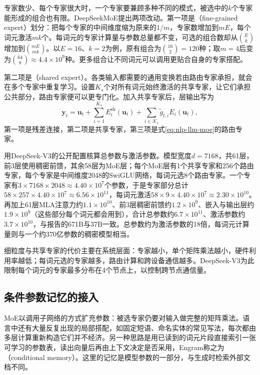 专家数少、每个专家很大时，一个专家要兼顾多种不同的模式，被选中的$k$个专家能形成的组合也有限。DeepSeekMoE提出两项改动。第一项是（fine-grained expert）划分：把每个专家的中间维度缩为原来的$1/m$，专家数增加到$mE$，每个词元激活$mk$个。每词元的专家计算量与参数总量都不变，可选的组合数却从$\binom{E}{k}$增加到$\binom{mE}{mk}$。以$E=16$、$k=2$为例，原有组合为$\binom{16}{2}=120$种；取$m=4$后变为$\binom{64}{8}\approx4.4\times10^9$种。更多组合让不同词元可以调用更贴合自身的专家搭配。

第二项是（shared expert）。各类输入都需要的通用变换若由路由专家承担，就会在多个专家中重复学习。设置$K_s$个对所有词元始终激活的共享专家，让它们承担公共部分，路由专家便可以更专门化。加入共享专家后，层输出写为
\begin{equation}
 \bm y_t=\bm u_t+\sum_{i=1}^{K_s}E_i^{\mathrm{sh}}(\bm u_t)+\sum_{i\in\mathcal K_t}\tilde g_{t,i}E_i(\bm u_t),
 \label{eq:nlp-llm-shared-experts}
\end{equation}
第一项是残差连接，第二项是共享专家，第三项是式\eqref{eq:nlp-llm-moe}的路由专家。

用DeepSeek-V3的公开配置核算总参数与激活参数。模型宽度$d=7168$，共61层，前3层使用稠密前馈，其余58层为MoE层；每个MoE层有1个共享专家和256个路由专家，每个专家是中间维度2048的SwiGLU网络，每词元选8个路由专家。一个专家有$3\times7168\times2048\approx4.40\times10^7$个参数，于是专家部分总计$58\times257\times4.40\times10^7\approx6.56\times10^{11}$，每词元激活$58\times9\times4.40\times10^7\approx2.30\times10^{10}$。再加上61层MLA注意力约$1.1\times10^{10}$、前3层稠密前馈约$1.2\times10^9$、嵌入与输出层约$1.9\times10^9$（这些部分每个词元都会用到），合计总参数约$6.7\times10^{11}$、激活参数约$3.7\times10^{10}$，与报告的671B与37B一致。总参数约为激活参数的18倍，每词元计算量则与一个约370亿参数的稠密模型相当。

细粒度与共享专家的代价主要在系统层面：专家越小，单个矩阵乘法越小，硬件利用率越低；每词元选的专家越多，路由计算和跨设备通信越多。DeepSeek-V3为此限制每个词元的专家最多分布在4个节点上，以控制跨节点通信量。

\subsection{条件参数记忆的接入}
\label{sec:nlp-llm-conditional-memory}

MoE以调用子网络的方式扩充参数：被选专家仍要对输入做完整的矩阵乘法。语言中还有大量反复出现的局部搭配，如固定短语、命名实体的常见写法，每次都由多层计算重新构造它们并不经济。另一种思路是用已读到的词元片段直接索引一张可学习的参数表，读出向量后再由上下文决定是否采用，Engram称之为（conditional memory）。这里的记忆是模型参数的一部分，与生成时检索外部文档不同。

